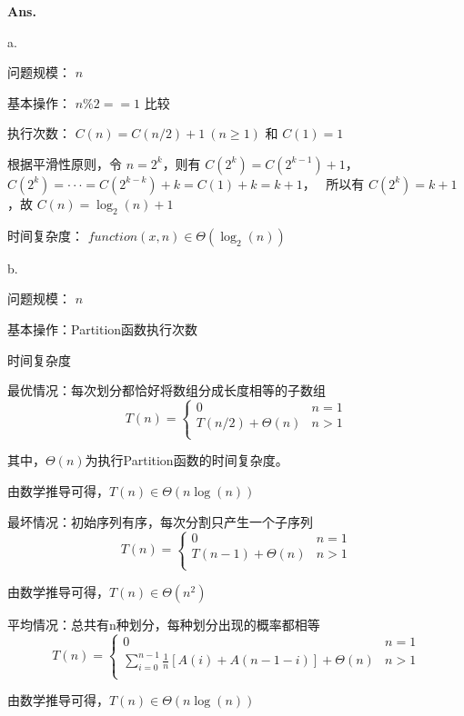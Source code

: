 \documentclass[12pt, a4paper, UTF8, fontset=windows]{ctexbook}
\newenvironment{solution}{\par\noindent\textbf{Ans.}}{\par}
\begin{document}
\begin{solution}
    
    a. 
    
    问题规模： $n$

    基本操作： $n \% 2 == 1$ 比较

    执行次数： $C(n) = C(n/2) + 1 ~(n \ge 1)$ 和 $C(1) = 1$

    根据平滑性原则，令 $n=2^k$，则有 $C(2^k) = C(2^{k-1}) + 1$，\ 
    $C(2^k) = ··· = C(2^{k-k}) + k = C(1) + k = k + 1$， \
    所以有 $C(2^k) = k + 1$，故 $C(n) = \log_{2}(n) + 1$

    时间复杂度： $function(x, n) \in \Theta(\log_{2}(n))$
    \vspace{2mm}  %

    b. 
    
    问题规模： $n$

    基本操作：Partition函数执行次数

    时间复杂度

    最优情况：每次划分都恰好将数组分成长度相等的子数组 
    \begin{equation}
        T(n)=\left\{
        \begin{array}{cl}
        0           & n = 1 \\
        T(n/2) + \Theta(n)  & n > 1 \\
        \end{array} \right.
    \end{equation}   

    其中，$\Theta(n)$为执行Partition函数的时间复杂度。

    由数学推导可得，$T(n) \in \Theta(n\log(n))$
    
    最坏情况：初始序列有序，每次分割只产生一个子序列
    \begin{equation}
        T(n)=\left\{
        \begin{array}{cl}
        0           & n = 1 \\
        T(n-1) + \Theta(n)  & n > 1 \\
        \end{array} \right.
    \end{equation}    

    由数学推导可得，$T(n) \in \Theta(n^2)$

    平均情况：总共有n种划分，每种划分出现的概率都相等
    \begin{equation}
        T(n)=\left\{
        \begin{array}{cl}
        0           & n = 1 \\
        \sum_{i=0}^{n-1} \frac{1}{n}[A(i)+A(n-1-i)] + \Theta(n)  & n > 1 \\
        \end{array} \right.
    \end{equation}     

    由数学推导可得，$T(n) \in \Theta(n\log(n))$
\end{solution}
\end{document}
